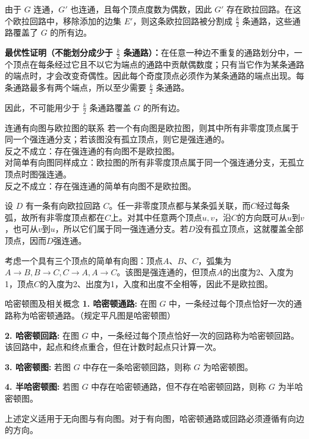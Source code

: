 \documentclass[lang=cn,11pt]{elegantbook}
\begin{document}
由于 $G$ 连通，$G'$ 也连通，且每个顶点度数为偶数，因此 $G'$ 存在欧拉回路。在这个欧拉回路中，移除添加的边集 $E'$，则这条欧拉回路被分割成 $\frac{k}{2}$ 条通路，这些通路覆盖了 $G$ 的所有边。
    
\textbf{最优性证明（不能划分成少于 $\frac{k}{2}$ 条通路）：}在任意一种边不重复的通路划分中，一个顶点在每条经过它且不以它为端点的通路中贡献偶数度；只有当它作为某条通路的端点时，才会改变奇偶性。因此每个奇度顶点必须作为某条通路的端点出现。每条通路最多有两个端点，所以至少需要 $\frac{k}{2}$ 条通路。
    
因此，不可能用少于 $\frac{k}{2}$ 条通路覆盖 $G$ 的所有边。
\begin{theorem}{连通有向图与欧拉图的联系}
若一个有向图是欧拉图，则其中所有非零度顶点属于同一个强连通分支；若该图没有孤立顶点，则它是强连通的。\\
反之不成立：存在强连通的有向图不是欧拉图。\\
对简单有向图同样成立：欧拉图的所有非零度顶点属于同一个强连通分支，无孤立顶点时图强连通。\\
反之不成立：存在强连通的简单有向图不是欧拉图。
\end{theorem}
设 $D$ 有一条有向欧拉回路 $C$。任一非零度顶点都与某条弧关联，而$C$经过每条弧，故所有非零度顶点都在$C$上。对其中任意两个顶点$u,v$，沿$C$的方向既可从$u$到$v$，也可从$v$到$u$，所以它们属于同一强连通分支。若$D$没有孤立顶点，这就覆盖全部顶点，因而$D$强连通。

考虑一个具有三个顶点的简单有向图：顶点$A$、$B$、$C$，弧集为$A\to B,B\to C,C\to A,A\to C$。该图是强连通的，但顶点$A$的出度为2、入度为1，顶点$C$的入度为2、出度为1，入度和出度不全相等，因此不是欧拉图。
\begin{definition}{哈密顿图及相关概念}
    \textbf{1. 哈密顿通路:}
    在图 $G$ 中，一条经过每个顶点恰好一次的通路称为哈密顿通路。（规定平凡图是哈密顿图）

    \textbf{2. 哈密顿回路:}
    在图 $G$ 中，一条经过每个顶点恰好一次的回路称为哈密顿回路。该回路中，起点和终点重合，但在计数时起点只计算一次。

    \textbf{3. 哈密顿图:}
    若图 $G$ 中存在一条哈密顿回路，则称 $G$ 为哈密顿图。

    \textbf{4. 半哈密顿图:}
    若图 $G$ 中存在哈密顿通路，但不存在哈密顿回路，则称 $G$ 为半哈密顿图。
\end{definition}
上述定义适用于无向图与有向图。对于有向图，哈密顿通路或回路必须遵循有向边的方向。
\end{document}
